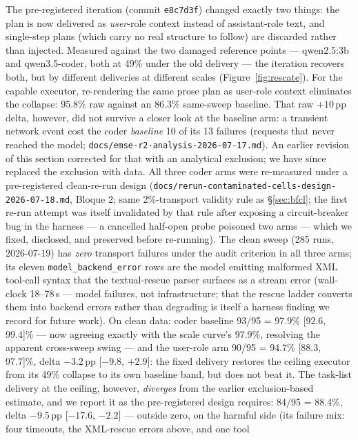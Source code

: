 \documentclass[smallcondensed,natbib]{svjour3}
\begin{document}
The pre-registered iteration (commit \texttt{e8c7d3f}) changed exactly
two things: the plan is now delivered as \emph{user}-role context
instead of assistant-role text, and single-step plans (which carry no
real structure to follow) are discarded rather than injected. Measured
against the two damaged reference points --- qwen2.5:3b and
qwen3.5-coder, both at 49\% under the old delivery --- the iteration
recovers both, but by different deliveries at different scales
(Figure~\ref{fig:rescate}). For the capable executor, re-rendering the
same prose plan as user-role context eliminates the collapse: 95.8\%
raw against an 86.3\% same-sweep baseline. That raw $+10$\,pp delta,
however, did not survive a closer look at the baseline arm: a
transient network event cost the coder \emph{baseline} 10 of its 13
failures (requests that never reached the model;
\texttt{docs/emse-r2-analysis-2026-07-17.md}). An earlier revision of
this section corrected for that with an analytical exclusion; we have
since replaced the exclusion with data. All three coder arms were
re-measured under a pre-registered clean-re-run design
(\texttt{docs/rerun-contaminated-cells-design-2026-07-18.md}, Bloque
2; same 2\%-transport validity rule as \S\ref{sec:bfcl}; the first
re-run attempt was itself invalidated by that rule after exposing a
circuit-breaker bug in the harness --- a cancelled half-open probe
poisoned two arms --- which we fixed, disclosed, and preserved before
re-running). The clean sweep (285 runs, 2026-07-19) has \emph{zero}
transport failures under the audit criterion in all three arms; its
eleven \texttt{model\_backend\_error} rows are the model emitting
malformed XML tool-call syntax that the textual-rescue parser
surfaces as a stream error (wall-clock 18--78\,s --- model failures,
not infrastructure; that the rescue ladder converts them into
backend errors rather than degrading is itself a harness finding we
record for future work). On clean data: coder baseline 93/95 =
97.9\% [92.6, 99.4]\% --- now agreeing exactly with the scale
curve's 97.9\%, resolving the apparent cross-sweep swing --- and the
user-role arm 90/95 = 94.7\% [88.3, 97.7]\%, delta $-3.2$\,pp
[$-9.8$, $+2.9$]: the fixed delivery restores the ceiling executor
from its 49\% collapse to its own baseline band, but does not beat
it. The task-list delivery at the ceiling, however, \emph{diverges}
from the earlier exclusion-based estimate, and we report it as the
pre-registered design requires: 84/95 = 88.4\%, delta $-9.5$\,pp
[$-17.6$, $-2.2$] --- outside zero, on the harmful side (its failure
mix: four timeouts, the XML-rescue errors above, and one tool
\end{document}
